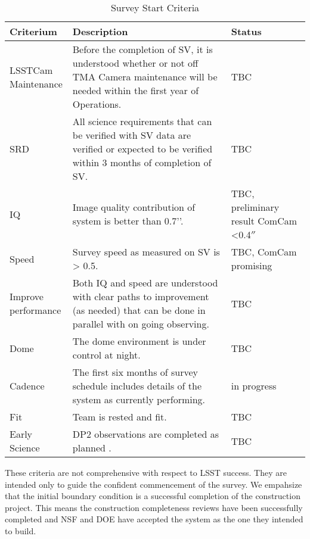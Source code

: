 \begin{table}[]
\renewcommand{\arraystretch}{2}
\small
\centering
\caption{Survey Start Criteria}\label{tab:criteria}
\begin{tabular}{|p{1in}|p{4in}|p{1.0in}|}
\hline
Criterium & Description& Status \\
\hline \hline

\makecell[l]{LSSTCam\\ Maintenance} & Before the completion of SV, it is understood whether or not off TMA Camera maintenance will be needed within the first year of Operations.& TBC \\\hline  
SRD &All science requirements that can be verified with SV data are verified or expected to be verified within 3 months of completion of SV. & TBC \\\hline
IQ& Image quality contribution of system is better than 0.7’’. & \makecell[l]{TBC, \\preliminary \\result \\ComCam <0.4$''$}\\\hline
Speed & Survey speed as measured on SV is > 0.5. & TBC, ComCam promising\\\hline
\makecell[l]{Improve\\ performance} & Both IQ and speed are understood with clear paths to improvement (as needed) that can be done in parallel with on going observing.& TBC \\\hline
Dome & The dome environment is under control at night. & TBC\\\hline
Cadence& The first six months of survey schedule includes details of the system as currently performing.& in progress\\\hline
Fit & Team is rested and fit. & TBC\\\hline
Early Science&DP2 observations are completed as planned \citep{RTN-011}.& TBC \\

\hline
\end{tabular}
\end{table}

These criteria are not comprehensive with respect to LSST success. They are intended only to guide the confident commencement of the survey. We empahsize that the initial boundary condition is a successful completion of the construction project. This means the construction completeness reviews have been successfully completed and NSF and DOE have accepted the system as the one they intended to build.

